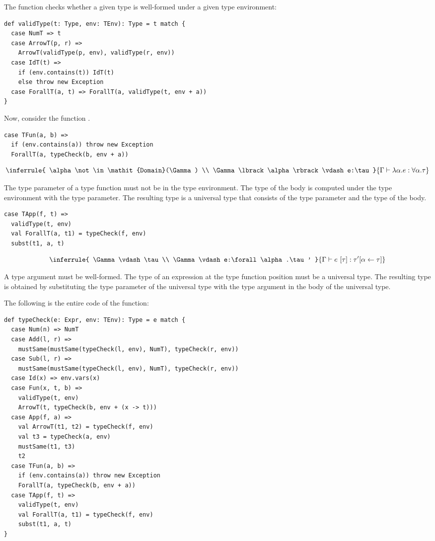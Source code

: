 The function  checks whether a given type is well-formed under a
given type environment:

\begin{verbatim}
def validType(t: Type, env: TEnv): Type = t match {
  case NumT => t
  case ArrowT(p, r) =>
    ArrowT(validType(p, env), validType(r, env))
  case IdT(t) =>
    if (env.contains(t)) IdT(t)
    else throw new Exception
  case ForallT(a, t) => ForallT(a, validType(t, env + a))
}
\end{verbatim}

Now, consider the function .

\begin{verbatim}
case TFun(a, b) =>
  if (env.contains(a)) throw new Exception
  ForallT(a, typeCheck(b, env + a))
\end{verbatim}

\[
\inferrule
{ \alpha\not\in\mathit{Domain}(\Gamma) \\
  \Gamma\lbrack\alpha\rbrack\vdash e:\tau }
{ \Gamma\vdash \lambda \alpha.e:\forall\alpha.\tau }
\]

The type parameter of a type function must not be in the type environment. The
type of the body is computed under the type environment with the type parameter.
The resulting type is a universal type that consists of the type parameter and
the type of the body.

\begin{verbatim}
case TApp(f, t) =>
  validType(t, env)
  val ForallT(a, t1) = typeCheck(f, env)
  subst(t1, a, t)
\end{verbatim}

\[
\inferrule
{ \Gamma\vdash\tau \\ \Gamma\vdash e:\forall\alpha.\tau' }
{ \Gamma\vdash e\ \lbrack\tau\rbrack:\tau'\lbrack\alpha\leftarrow\tau\rbrack }
\]

A type argument must be well-formed. The type of an expression at the type
function position must be a universal type. The resulting type is obtained by
substituting the type parameter of the universal type with the type argument in
the body of the universal type.

The following is the entire code of the  function:

\begin{verbatim}
def typeCheck(e: Expr, env: TEnv): Type = e match {
  case Num(n) => NumT
  case Add(l, r) =>
    mustSame(mustSame(typeCheck(l, env), NumT), typeCheck(r, env))
  case Sub(l, r) =>
    mustSame(mustSame(typeCheck(l, env), NumT), typeCheck(r, env))
  case Id(x) => env.vars(x)
  case Fun(x, t, b) =>
    validType(t, env)
    ArrowT(t, typeCheck(b, env + (x -> t)))
  case App(f, a) =>
    val ArrowT(t1, t2) = typeCheck(f, env)
    val t3 = typeCheck(a, env)
    mustSame(t1, t3)
    t2
  case TFun(a, b) =>
    if (env.contains(a)) throw new Exception
    ForallT(a, typeCheck(b, env + a))
  case TApp(f, t) =>
    validType(t, env)
    val ForallT(a, t1) = typeCheck(f, env)
    subst(t1, a, t)
}
\end{verbatim}


